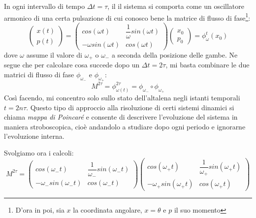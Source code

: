 \documentclass[a4paper,openany]{article}
\begin{document}
	In ogni intervallo di tempo $\Delta t = \tau$, il il sistema si comporta come un oscillatore armonico di una certa pulsazione di cui conosco bene la matrice di flusso di fase\footnote{D'ora in poi, sia $x$ la coordinata angolare, $x = \theta$ e $p$ il suo momento}:
	\begin{equation}
		\begin{pmatrix}
			x(t) \\ p(t)
		\end{pmatrix}
		= 
		\begin{pmatrix}
			cos(\omega t) & \dfrac{1}{\omega}sin(\omega t)\\
			-\omega sin(\omega t) & cos(\omega t)
		\end{pmatrix}
		\begin{pmatrix}
			x_{0} \\ p_{0}
		\end{pmatrix}
		=
		\phi_{\omega}^{t}(x_{0})
	\end{equation}
	dove $\omega$ assume il valore di $\omega_{+}$ o $\omega_{-}$ a seconda della posizione delle gambe. Ne segue che per calcolare cosa succede dopo un $\Delta t = 2\tau$, mi basta combinare le due matrici di flusso di fase $\phi_{\omega_{-}} \mbox{ e }\phi_{\omega_{+}}$:
	$$
	M^{2\tau} = \phi^{2\tau}_{\omega(t)} = \phi_{\omega_{-}} \circ \phi_{\omega_{+}}
	$$
	Così facendo, mi concentro solo sullo stato dell'altalena negli istanti temporali $t=2n\tau $.
	Questo tipo di approccio alla risoluzione di certi sistemi dinamici si chiama \textit{mappa di Poincaré} e consente di descrivere l'evoluzione del sistema in maniera stroboscopica, cioè andandolo a studiare dopo ogni periodo e ignorarne l'evoluzione interna. 
	
	Svolgiamo ora i calcoli:
	\begin{equation}
		M^{2\tau} = 
		\begin{pmatrix}
			cos(\omega_{-} t) & \dfrac{1}{\omega_-} sin(\omega_{-} t)\\
			-\omega_{-} sin(\omega_{-} t) & cos(\omega_{-} t)
		\end{pmatrix}
		\begin{pmatrix}
			cos(\omega_{+} t) & \dfrac{1}{\omega_+}sin(\omega_{+} t)\\
			-\omega_+ sin(\omega_{+} t) & cos(\omega_{+} t)
		\end{pmatrix}
		\label{MatriceAltalena}
	\end{equation}
	
\end{document}

